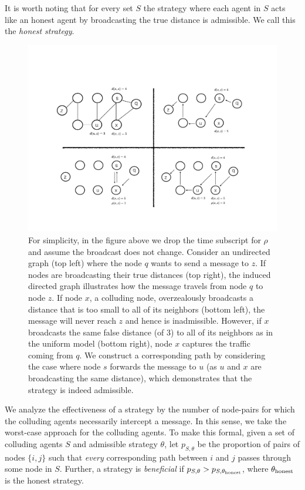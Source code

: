 \documentclass{comnet}
\begin{document}
It is worth noting that for every set $S$ the strategy where each agent in $S$
acts like an honest agent by broadcasting the true distance is admissible. We
call this the {\it honest strategy}.

\begin{figure}
\centering
\includegraphics[width=\textwidth]{images/bgppanel2}
\caption{For simplicity, in the figure above we drop the time subscript for
$\rho$ and assume the broadcast does not change. Consider an undirected graph
(top left) where the node $q$ wants to send a message to $z$.  If nodes are
broadcasting their true distances (top right), the induced directed graph
illustrates how the message travels from node $q$ to node $z$.  If node $x$, a
colluding node, overzealously broadcasts a distance that is too small to all of
its neighbors (bottom left), the message will never reach $z$ and hence is
inadmissible.  However, if $x$ broadcasts the same false distance (of 3) to all
of its neighbors as in the uniform model (bottom right), node $x$ captures the
traffic coming from $q$.  We construct a corresponding path by considering the
case where node $s$ forwards the message to $u$ (as $u$ and $x$ are
broadcasting the same distance), which demonstrates that the strategy is indeed
admissible.}
\label{fig:admissibility}
\end{figure}

We analyze the effectiveness of a strategy by the number of node-pairs for
which the colluding agents necessarily intercept a message. In this sense, we
take the worst-case approach for the colluding agents. To make this formal,
given a set of colluding agents $S$ and admissible strategy $\theta$, let
$p_{S,\theta}$ be the proportion of pairs of nodes $\{i, j\}$ such that {\em
every} corresponding path between $i$ and $j$ passes through some node in $S$.
Further, a strategy is \emph{beneficial} if $p_{S,\theta} > p_{S,
\theta_{\textup{honest}}}$, where $\theta_{\textup{honest}}$ is the honest
strategy.
\end{document}
